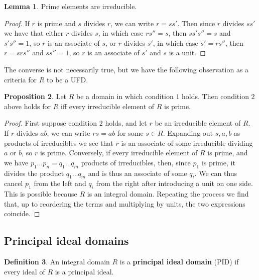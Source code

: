 \documentclass{article}
\theoremstyle{definition}\newtheorem{definition}{Definition}[section]
\theoremstyle{definition}\newtheorem{remark}[definition]{Remark}
\theoremstyle{definition}\newtheorem*{example}{Example}
\theoremstyle{definition}\newtheorem*{note}{Note}
\newtheorem{proposition}[definition]{Proposition}
\newtheorem{lemma}[definition]{Lemma}
\begin{document}
\begin{lemma}
Prime elements are irreducible.
\end{lemma}

\begin{proof}
If $ r $ is prime and $ s $ divides $ r $, we can write $ r = ss' $. Then since $ r $ divides $ ss' $ we have that either $ r $ divides $ s $, in which case $ rs'' = s $, then $ ss's'' = s $ and $ s's'' = 1 $, so $ r $ is an associate of $ s $, or $ r $ divides $ s' $, in which case $ s' = rs'' $, then $ r = srs'' $ and $ ss'' = 1 $, so $ r $ is an associate of $ s' $ and $ s $ is a unit.
\end{proof}

The converse is not necessarily true, but we have the following observation as a criteria for $ R $ to be a UFD.

\begin{proposition}
Let $ R $ be a domain in which condition $ 1 $ holds. Then condition $ 2 $ above holds for $ R $ iff every irreducible element of $ R $ is prime.
\end{proposition}

\begin{proof}
First suppose condition $ 2 $ holds, and let $ r $ be an irreducible element of $ R $. If $ r $ divides $ ab $, we can write $ rs = ab $ for some $ s \in R $. Expanding out $ s, a, b $ as products of irreducibles we see that $ r $ is an associate of some irreducible dividing $ a $ or $ b $, so $ r $ is prime. Conversely, if every irreducible element of $ R $ is prime, and we have $ p_1 \dots p_n = q_1 \dots q_m $ products of irreducibles, then, since $ p_1 $ is prime, it divides the product $ q_1 \dots q_m $ and is thus an associate of some $ q_i $. We can thus cancel $ p_1 $ from the left and $ q_i $ from the right after introducing a unit on one side. This is possible because $ R $ is an integral domain. Repeating the process we find that, up to reordering the terms and multiplying by units, the two expressions coincide.
\end{proof}

\subsection{Principal ideal domains}

\begin{definition}
An integral domain $ R $ is a \textbf{principal ideal domain} (PID) if every ideal of $ R $ is a principal ideal.
\end{definition}
\end{document}
